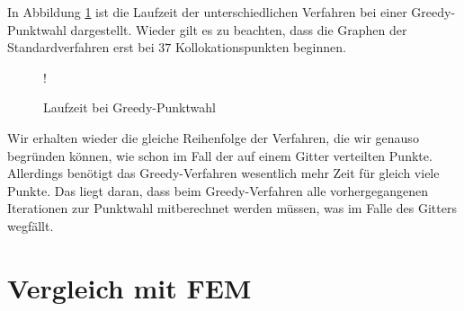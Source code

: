 In Abbildung \ref{fig:Laufzeit-greedy} ist die Laufzeit der unterschiedlichen Verfahren bei einer Greedy-Punktwahl dargestellt. Wieder gilt es zu beachten, dass die Graphen der Standardverfahren erst bei $37$ Kollokationspunkten beginnen.
\begin{figure}[ht]
\centering
\resizebox {\columnwidth} {!} {

}
\caption{Laufzeit bei Greedy-Punktwahl}
\label{fig:Laufzeit-greedy}
\end{figure}

Wir erhalten wieder die gleiche Reihenfolge der Verfahren, die wir genauso begründen können, wie schon im Fall der auf einem Gitter verteilten Punkte. Allerdings benötigt das Greedy-Verfahren wesentlich mehr Zeit für gleich viele Punkte. Das liegt daran, dass beim Greedy-Verfahren alle vorhergegangenen Iterationen zur Punktwahl mitberechnet werden müssen, was im Falle des Gitters wegfällt.

\section{Vergleich mit \ac{FEM}}

